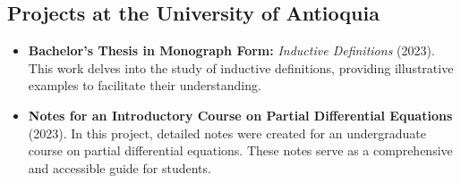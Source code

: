\subsection*{\textbf{Projects at the University of Antioquia}}
\begin{itemize}
    \item \textbf{Bachelor's Thesis in Monograph Form:} \textit{Inductive Definitions} (2023). This work delves into the study of inductive definitions, providing illustrative examples to facilitate their understanding.
    \item \textbf{Notes for an Introductory Course on Partial Differential Equations} (2023). In this project, detailed notes were created for an undergraduate course on partial differential equations. These notes serve as a comprehensive and accessible guide for students.
\end{itemize}
